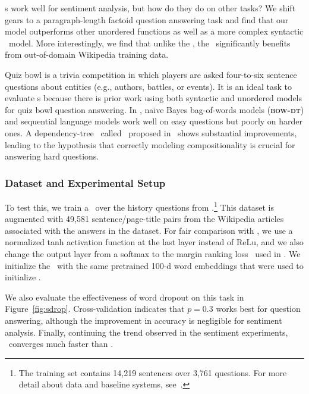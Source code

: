 \dan s work well for sentiment analysis, but how do they do on other 
tasks?  We shift gears to a paragraph-length factoid question answering task and
find that our model outperforms other unordered functions as well as a more
complex syntactic \recnn\ model. More interestingly, we find that unlike the
\recnn, the \dan\ significantly benefits from out-of-domain Wikipedia training
data.



Quiz bowl is a trivia competition in which players are asked
four-to-six sentence questions about entities (e.g., authors, battles,
or events). It is an ideal task to evaluate \dan s because there is
prior work using both syntactic and unordered models for quiz bowl
question answering. In ,
na\"{\i}ve Bayes bag-of-words models ({\bf \textsc{bow-dt}}) and sequential language models
work well on easy questions but poorly on harder ones. A
dependency-tree \recnn\ called \qanta\ proposed
in~ shows substantial improvements, leading to
the hypothesis that correctly modeling compositionality is crucial for answering
hard questions.

\subsubsection{Dataset and Experimental Setup}

To test this, we train a \dan\ over the history questions from
.\footnote{The training set contains 14,219 sentences over
  3,761 questions. For more detail about data and baseline systems,
  see~.} This dataset is augmented with 49,581
sentence/page-title pairs from the Wikipedia articles associated with the
answers in the dataset. For fair comparison with \qanta, we use a normalized
tanh activation function at the last layer instead of ReLu, and we also change
the output layer from a softmax to the margin ranking
loss~\cite{weston2011wsabie} used in \qanta. We initialize the \dan\ with the same pretrained 100-d word embeddings that were used to initialize \qanta.

We also evaluate the effectiveness of word dropout on this task in
Figure~\ref{fig:sdrop}. Cross-validation indicates that $p=0.3$ works best for question answering, although the improvement in
accuracy is negligible for sentiment analysis. Finally, continuing the trend observed in
the sentiment experiments, \dan\ converges much faster than \qanta.

